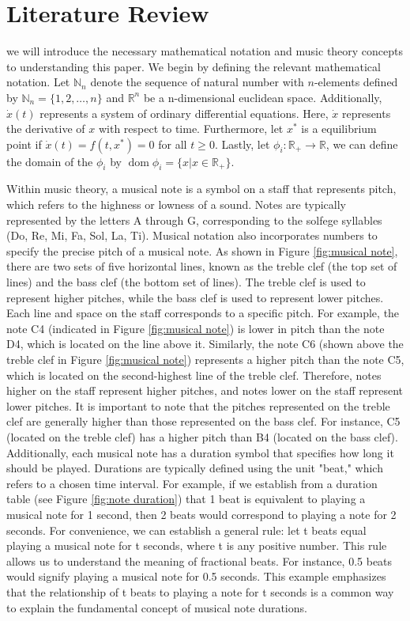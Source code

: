 \documentclass[11pt]{article}
\theoremstyle{definition}
\DeclareMathOperator{\dom}{dom}
\begin{document}
\section{Literature Review}
\label{sec: literaturereview}
we will introduce the necessary mathematical notation and music theory concepts to understanding this paper. 
We begin by defining the relevant mathematical notation. 
Let $\mathbb{N}_n$ denote the sequence of natural number with $n$-elements defined by $\mathbb{N}_n = \{ 1, 2, \dots, n \}$ and $\mathbb{R}^n$ be a n-dimensional euclidean space. Additionally, $\dot{x}(t)$ represents a system of ordinary differential equations. Here, $\dot{x}$ represents the derivative of $x$ with respect to time. Furthermore, let $x^*$ is a equilibrium point if $\dot{x}(t) = f(t, x^*) = 0$ for all $t \geq 0$. Lastly, let $\phi_i:\mathbb{R}_+ \to \mathbb{R}$, we can define the domain of the $\phi_i$ by $\dom{\phi_i} =  \{x | x \in \mathbb{R}_+ \}$.

Within music theory, a musical note is a symbol on a staff that represents pitch, which refers to the highness or lowness of a sound. Notes are typically represented by the letters A through G, corresponding to the solfege syllables (Do, Re, Mi, Fa, Sol, La, Ti). Musical notation also incorporates numbers to specify the precise pitch of a musical note. As shown in Figure \ref{fig:musical note}, there are two sets of five horizontal lines, known as the treble clef (the top set of lines) and the bass clef (the bottom set of lines).
The treble clef is used to represent higher pitches, while the bass clef is used to represent lower pitches. Each line and space on the staff corresponds to a specific pitch. For example, the note C4 (indicated in Figure \ref{fig:musical note}) is lower in pitch than the note D4, which is located on the line above it.
Similarly, the note C6 (shown above the treble clef in Figure \ref{fig:musical note}) represents a higher pitch than the note C5, which is located on the second-highest line of the treble clef. Therefore, notes higher on the staff represent higher pitches, and notes lower on the staff represent lower pitches.
It is important to note that the pitches represented on the treble clef are generally higher than those represented on the bass clef. For instance, C5 (located on the treble clef) has a higher pitch than B4 (located on the bass clef). 
Additionally, each musical note has a duration symbol that specifies how long it should be played. Durations are typically defined using the unit "beat," which refers to a chosen time interval. For example, if we establish from a duration table (see Figure \ref{fig:note duration}) that 1 beat is equivalent to playing a musical note for 1 second, then 2 beats would correspond to playing a note for 2 seconds. For convenience, we can establish a general rule: let t beats equal playing a musical note for t seconds, where t is any positive number. This rule allows us to understand the meaning of fractional beats. For instance, 0.5 beats would signify playing a musical note for 0.5 seconds. This example emphasizes that the relationship of t beats to playing a note for t seconds is a common way to explain the fundamental concept of musical note durations. 
\end{document}
